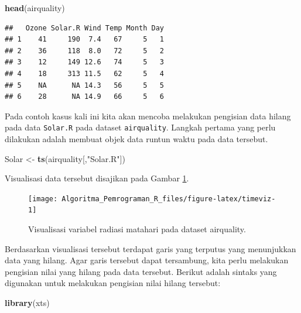 \documentclass[
]{book}
\newenvironment{Shaded}{\begin{snugshade}}{\end{snugshade}}
\newcommand{\FunctionTok}[1]{\textcolor[rgb]{0.13,0.29,0.53}{\textbf{#1}}}
\newcommand{\NormalTok}[1]{#1}
\newcommand{\OtherTok}[1]{\textcolor[rgb]{0.56,0.35,0.01}{#1}}
\newcommand{\StringTok}[1]{\textcolor[rgb]{0.31,0.60,0.02}{#1}}
\theoremstyle{definition}
\theoremstyle{definition}
\theoremstyle{definition}
\theoremstyle{definition}
\theoremstyle{remark}
\begin{document}
\begin{Shaded}
\begin{Highlighting}[]
\FunctionTok{head}\NormalTok{(airquality)}
\end{Highlighting}
\end{Shaded}

\begin{verbatim}
##   Ozone Solar.R Wind Temp Month Day
## 1    41     190  7.4   67     5   1
## 2    36     118  8.0   72     5   2
## 3    12     149 12.6   74     5   3
## 4    18     313 11.5   62     5   4
## 5    NA      NA 14.3   56     5   5
## 6    28      NA 14.9   66     5   6
\end{verbatim}

Pada contoh kasus kali ini kita akan mencoba melakukan pengisian data hilang pada data \texttt{Solar.R} pada dataset \texttt{airquality}. Langkah pertama yang perlu dilakukan adalah membuat objek data runtun waktu pada data tersebut.

\begin{Shaded}
\begin{Highlighting}[]
\NormalTok{Solar }\OtherTok{\textless{}{-}} \FunctionTok{ts}\NormalTok{(airquality[,}\StringTok{"Solar.R"}\NormalTok{])}
\end{Highlighting}
\end{Shaded}

Visualisasi data tersebut disajikan pada Gambar \ref{fig:timeviz}.

\begin{figure}

{\centering \texttt{[image: Algoritma\_Pemrograman\_R\_files/figure-latex/timeviz-1]} 

}

\caption{Visualisasi variabel radiasi matahari pada dataset airquality.}\label{fig:timeviz}
\end{figure}

Berdasarkan visualisasi tersebut terdapat garis yang terputus yang menunjukkan data yang hilang. Agar garis tersebut dapat tersambung, kita perlu melakukan pengisian nilai yang hilang pada data tersebut. Berikut adalah sintaks yang digunakan untuk melakukan pengisian nilai hilang tersebut:

\begin{Shaded}
\begin{Highlighting}[]
\FunctionTok{library}\NormalTok{(xts)}
\end{Highlighting}
\end{Shaded}
\end{document}
